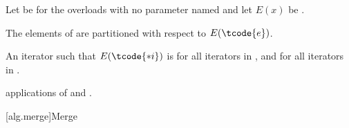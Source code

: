 \begin{itemdescr}
\pnum
Let  be 
for the overloads with no parameter named 
and let $E(x)$ be .

\pnum
\expects
The elements  of 
are partitioned with respect to $E(\tcode{e})$.

\pnum
\returns
An iterator 
such that $E(\tcode{*i})$ is 
for all iterators  in , and
 for all iterators  in .

\pnum
\complexity
{} applications
of  and .
\end{itemdescr}

[alg.merge]{Merge}

